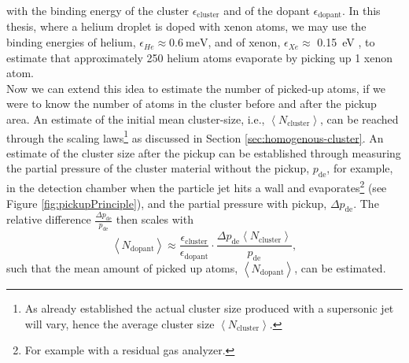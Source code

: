 with the binding energy of the cluster $\epsilon_{\text{cluster}}$ and of the dopant $\epsilon_{\text{dopant}}$. In this thesis, where a helium droplet is doped with xenon atoms, we may use the binding energies of helium, $\epsilon_{He}\approx \SI{0.6}{\milli\electronvolt}$, and of xenon, $\epsilon_{Xe}\approx$ \SI{0.15}{\electronvolt} \citep{Gomez-2011-JCP,Gomez-2014-Science}, to estimate that approximately 250 helium atoms evaporate by picking up 1 xenon atom.\\[1\baselineskip]
%
Now we can extend this idea to estimate the number of picked-up atoms, if we were to know the number of atoms in the cluster before and after the pickup area. An estimate of the initial mean cluster-size, i.e., $\left\langle N_{\text{cluster}}\right\rangle$, can be reached through the scaling laws\footnote{As already established the actual cluster size produced with a supersonic jet will vary, hence the average cluster size $\left\langle N_{\text{cluster}}\right\rangle$.} as discussed in Section \ref{sec:homogenous-cluster}. An estimate of the cluster size after the pickup can be established through measuring the partial pressure of the cluster material without the pickup, $p_{\text{de}}$, for example, in the detection chamber when the particle jet hits a wall and evaporates\footnote{For example with a residual gas analyzer.} (see Figure \ref{fig:pickupPrinciple}), and the partial pressure with pickup, $\Delta p_{\text{de}}$. The relative difference $\tfrac{\Delta p_{\text{de}}}{p_{\text{de}}}$ then scales with \cite{Gomez-2014-Science}
\begin{equation}
\left\langle N_{\text{dopant}}\right\rangle \approx \frac{\epsilon_{\text{cluster}}}{\epsilon_{\text{dopant}}} \cdot \frac{\Delta p_{\text{de}} \left\langle N_{\text{cluster}}\right\rangle}{p_{\text{de}}},
\label{eq:average-dopant}
\end{equation}
such that the mean amount of picked up atoms, $\left\langle N_{\text{dopant}}\right\rangle$, can be estimated.
%
